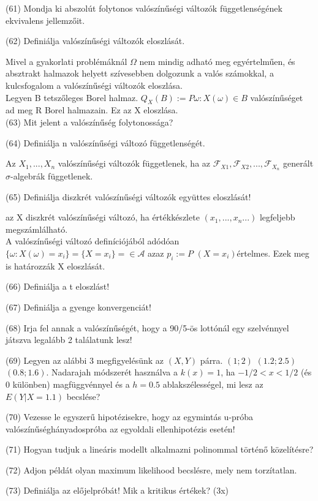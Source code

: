 \documentclass[12p]{article}
\begin{document}
(61) Mondja ki abszolút folytonos valószínűségi változók függetlenségének ekvivalens jellemzőit.

(62) Definiálja valószínűségi változók eloszlását.

Mivel a gyakorlati problémáknál $\Omega$ nem
mindig adható meg egyértelműen, és
absztrakt halmazok helyett szívesebben
dolgozunk a valós számokkal, a kulcsfogalom
a valószínűségi változók eloszlása.\\
Legyen B tetszőleges Borel halmaz.
$Q_X(B):= P{\omega: X(\omega) \in B}$ valószínűséget ad
meg R Borel halmazain. Ez az X eloszlása.\\

(63) Mit jelent a valószínűség folytonossága?

(64) Definiálja n valószínűségi változó függetlenségét.

 Az $X_1,...,X_n$ valószínűségi változók függetlenek, ha az $\mathscr{F}_{X1}, \mathscr{F}_{X2} ,...,\mathscr{F}_{X_n}$ generált $\sigma$-algebrák függetlenek.

(65) Definiálja diszkrét valószínűségi változók együttes eloszlását!

az X diszkrét valószínűségi változó, ha értékkészlete $(x_1 ,..., x_n...)$ legfeljebb megszámlálható.\\
A valószínűségi változó definíciójából adódóan $\{\omega:X(\omega)= x_i\}=\{X=x_i\}= \in \mathscr{A}$ azaz $p_i:=P$ $(X=x_i)$értelmes. Ezek meg is határozzák X eloszlását.

(66) Definiálja a t eloszlást!

(67) Definiálja a gyenge konvergenciát!

(68) Irja fel annak a valószínűségét, hogy a 90/5-ös lottónál egy szelvénnyel játszva legalább 2 találatunk lesz!

(69) Legyen az alábbi 3 megfigyelésünk az $(X, Y)$ párra. $(1;2)$ $(1.2;2.5)$ $(0.8;1.6)$. Nadarajah
módszerét használva a $k(x) = 1$, ha $-1/2 < x < 1/2$ (és 0 különben) magfüggvénnyel és a $h = 0.5$ ablakszélességel, mi lesz az $E(Y|X = 1.1)$ becslése?

(70) Vezesse le egyszerű hipotézisekre, hogy az egymintás u-próba valószínűséghányadospróba az egyoldali ellenhipotézis esetén!

(71) Hogyan tudjuk a lineáris modellt alkalmazni polinommal történő közelítésre?

(72) Adjon példát olyan maximum likelihood becslésre, mely nem torzítatlan.

(73) Definiálja az előjelpróbát! Mik a kritikus értékek? (3x)
\end{document}
